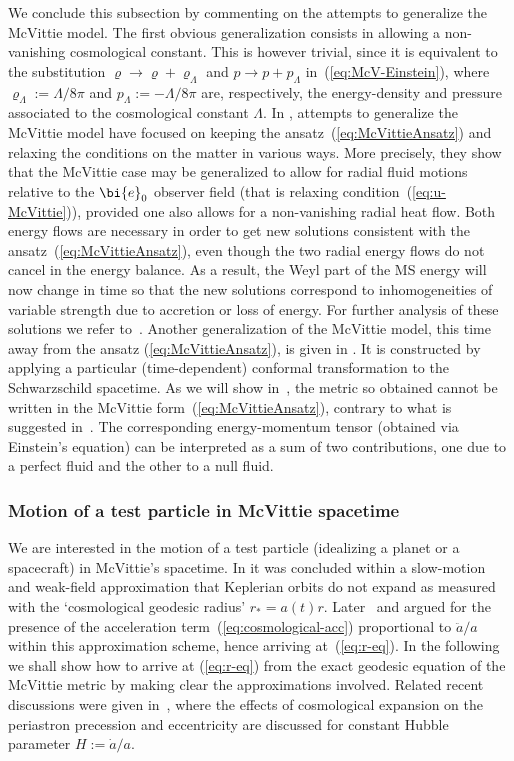 \documentclass
[rmp,aps,twocolumn,showpacs,preprintnumbers,amsmath,amssymb]{revtex4}
\theoremstyle{plain}
\theoremstyle{definition}
\theoremstyle{remark}
\newcommand{\be}{\bi{e}}
\begin{document}
We conclude this subsection by commenting on the attempts to generalize the 
McVittie model. The first obvious generalization consists in allowing a 
non-vanishing cosmological constant. This is however trivial, since it is 
equivalent to the substitution $\varrho \to \varrho+\varrho_\Lambda$ and 
$p\to p+p_\Lambda$ in~(\ref{eq:McV-Einstein}), where 
$\varrho_\Lambda:=\Lambda/8\pi$ and $p_\Lambda:=-\Lambda/8\pi$ are, 
respectively, the energy-density and pressure associated to the cosmological 
constant $\Lambda$. 
In \cite{Faraoni.Jacques:2007}, attempts to generalize the McVittie model 
have focused on keeping the ansatz~(\ref{eq:McVittieAnsatz}) and relaxing 
the conditions on the matter in various ways. More precisely, they show that 
the McVittie case may be generalized to allow for radial fluid motions 
relative to the $\be_0$ observer field (that is relaxing 
condition~(\ref{eq:u-McVittie})), provided one also allows for a 
non-vanishing radial heat flow. Both energy flows are necessary in order to 
get new solutions consistent with the ansatz~(\ref{eq:McVittieAnsatz}), 
even though the two radial energy flows do not cancel in the energy balance. 
As a result, the Weyl part of the MS energy will now change in time so that 
the new solutions correspond to inhomogeneities of variable strength due to 
accretion or loss of energy.  For further analysis of these solutions we refer 
to~\cite{Carrera.Giulini:2009a}. Another generalization of the McVittie model,
this time away from the ansatz (\ref{eq:McVittieAnsatz}), is given in 
\cite{Sultana.Dyer:2005}. It is constructed by applying 
a particular (time-dependent) conformal transformation to the Schwarzschild 
spacetime. As we will show in~\cite{Carrera.Giulini:2009a}, the metric so
obtained cannot be written in the McVittie form~(\ref{eq:McVittieAnsatz}), 
contrary to what is suggested in~\cite{Faraoni.Jacques:2007}. 
The corresponding energy-momentum tensor (obtained via Einstein's 
equation) can be interpreted as a sum of two contributions, one due to a 
perfect fluid and the other to a null fluid. 


\subsubsection{Motion of a test particle in McVittie spacetime}
\label{sec:MotionInMcVittie}
%
We are interested in the motion of a test particle (idealizing a 
planet or a spacecraft) in McVittie's spacetime. In \cite{McVittie:1933} 
it was concluded within a slow-motion and weak-field approximation
that Keplerian orbits do not expand as measured with the `cosmological 
geodesic radius' $r_*=a(t)r$. Later~\cite{Pachner:1963} and 
\cite{Noerdlinger.Petrosian:1971} argued for the presence of the 
acceleration term~(\ref{eq:cosmological-acc}) proportional to 
$\ddot{a}/a$ within this approximation scheme, hence arriving 
at~(\ref{eq:r-eq}). In the following we shall show how to 
arrive at (\ref{eq:r-eq}) from the exact geodesic equation of the 
McVittie metric by making clear the approximations involved. 
Related recent discussions were given in~\cite{Bolen.etal:2001},
where the effects of cosmological expansion on the periastron 
precession and eccentricity are discussed for constant Hubble 
parameter $H:=\dot{a}/a$. 
\end{document}
